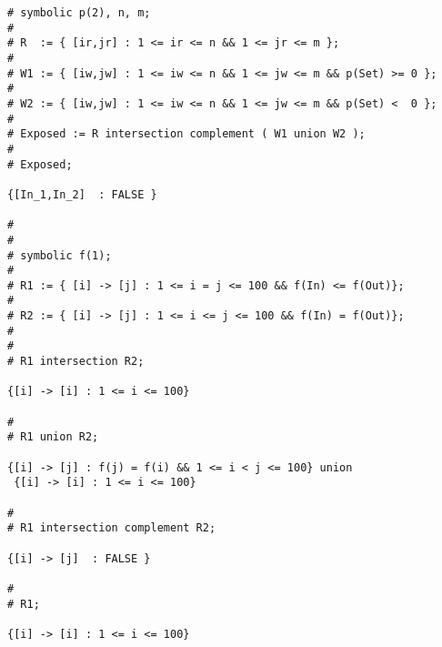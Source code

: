 \begin{verbatim}
# symbolic p(2), n, m;
# 
# R  := { [ir,jr] : 1 <= ir <= n && 1 <= jr <= m };
# 
# W1 := { [iw,jw] : 1 <= iw <= n && 1 <= jw <= m && p(Set) >= 0 };
# 
# W2 := { [iw,jw] : 1 <= iw <= n && 1 <= jw <= m && p(Set) <  0 };
# 
# Exposed := R intersection complement ( W1 union W2 );
# 
# Exposed;

{[In_1,In_2]  : FALSE }

# 
# 
# symbolic f(1);
# 
# R1 := { [i] -> [j] : 1 <= i = j <= 100 && f(In) <= f(Out)};
# 
# R2 := { [i] -> [j] : 1 <= i <= j <= 100 && f(In) = f(Out)};
# 
# 
# R1 intersection R2;

{[i] -> [i] : 1 <= i <= 100}

# 
# R1 union R2;

{[i] -> [j] : f(j) = f(i) && 1 <= i < j <= 100} union
 {[i] -> [i] : 1 <= i <= 100}

# 
# R1 intersection complement R2;

{[i] -> [j]  : FALSE }

# 
# R1;

{[i] -> [i] : 1 <= i <= 100}

\end{verbatim}
